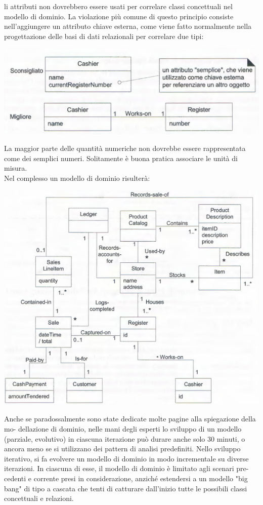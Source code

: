 \documentclass[a4paper,12pt, oneside]{book}
\begin{document}
li attributi non dovrebbero essere usati per correlare classi concettuali nel modello
di dominio. La violazione più comune di questo principio consiste nell'aggiungere un
attributo chiave esterna, come viene fatto normalmente nella progettazione delle basi
di dati relazionali per correlare due tipi:
\begin{center}
	\includegraphics[scale=0.7]{img/datd3.png}
\end{center}
La maggior parte delle quantità numeriche non dovrebbe essere rappresentata come dei semplici numeri. Solitamente è buona pratica associare le unità di misura.\\
Nel complesso un modello di dominio risulterà:
\begin{center}
	\includegraphics[scale=0.7]{img/complex.png}
\end{center}
\begin{shaded}
Anche se paradossalmente sono state dedicate molte pagine alla spiegazione della mo-
dellazione di dominio, nelle mani degli esperti lo sviluppo di un modello (parziale,
evolutivo) in ciascuna iterazione può durare anche solo 30 minuti, o ancora meno se si
utilizzano dei pattern di analisi predefiniti.
Nello sviluppo iterativo, si fa evolvere un modello di dominio in modo incrementale su
diverse iterazioni. In ciascuna di esse, il modello di dominio è limitato agli scenari pre-
cedenti e corrente presi in considerazione, anziché estendersi a un modello "big bang"
di tipo a cascata che tenti di catturare dall'inizio tutte le possibili classi concettuali e
relazioni.
\end{shaded}
\end{document}
